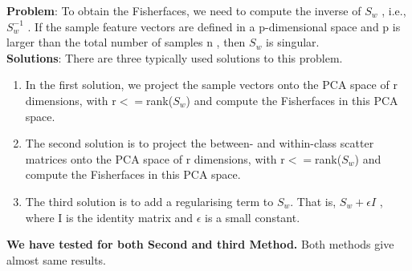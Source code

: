 \documentclass[a4paper,10pt]{report}
\begin{document}
\noindent
\textbf{Problem}: To obtain the Fisherfaces, we need to compute the inverse of $S_w$ , i.e., $S_w^{-1}$ . 
If the sample feature vectors are defined in a p-dimensional space and p is larger than the total number of samples n , then $S_w$ is singular. \\
\textbf{Solutions}: There are three typically used solutions to this problem.
\begin{enumerate}
 \item In the first solution, we project the sample vectors onto the PCA space of r dimensions, with r$<=$rank($S_w$) and compute 
 the Fisherfaces in this PCA space.
 \item The second solution is to project the between- and within-class scatter matrices onto the PCA space of r dimensions, with r$<=$rank($S_w$) and compute 
 the Fisherfaces in this PCA space.
 
 
 \item The third solution is to add a regularising term to $S_w$.
That is, $S_w+\epsilon I$ , where I is the identity matrix and $\epsilon$ is a small constant.
\end{enumerate}

\textbf{We have tested for both Second and third Method.} Both methods give almost same results.\\
\end{document}
